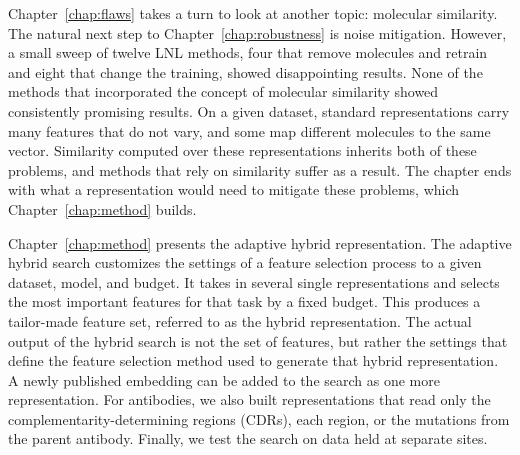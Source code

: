 Chapter~\ref{chap:flaws} takes a turn to look at another topic: molecular similarity. The natural next step to Chapter~\ref{chap:robustness} is noise mitigation. However, a small sweep of twelve LNL methods, four that remove molecules and retrain and eight that change the training, showed disappointing results. None of the methods that incorporated the concept of molecular similarity showed consistently promising results. On a given dataset, standard representations carry many features that do not vary, and some map different molecules to the same vector. Similarity computed over these representations inherits both of these problems, and methods that rely on similarity suffer as a result. The chapter ends with what a representation would need to mitigate these problems, which Chapter~\ref{chap:method} builds.

Chapter~\ref{chap:method} presents the adaptive hybrid representation. The adaptive hybrid search customizes the settings of a feature selection process to a given dataset, model, and budget. It takes in several single representations and selects the most important features for that task by a fixed budget. This produces a tailor-made feature set, referred to as the hybrid representation. The actual output of the hybrid search is not the set of features, but rather the settings that define the feature selection method used to generate that hybrid representation. A newly published embedding can be added to the search as one more representation. For antibodies, we also built representations that read only the complementarity-determining regions (CDRs), each region, or the mutations from the parent antibody. Finally, we test the search on data held at separate sites.

